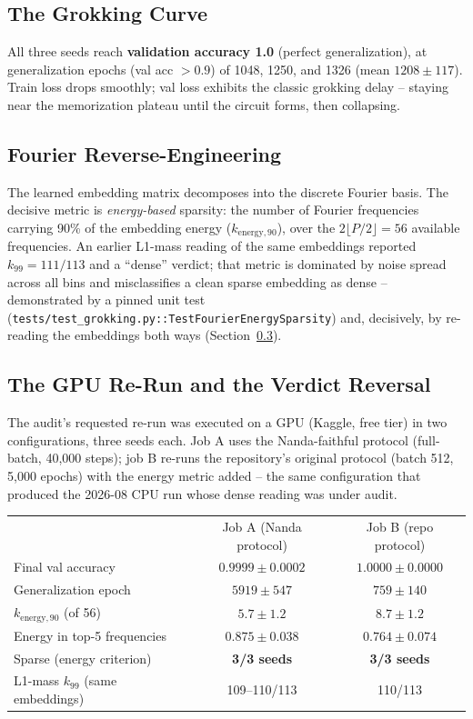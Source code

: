 \documentclass[11pt]{article}
\begin{document}
\subsection{The Grokking Curve}
All three seeds reach \textbf{validation accuracy 1.0} (perfect
generalization), at generalization epochs (val acc $>0.9$) of 1048, 1250,
and 1326 (mean $1208 \pm 117$). Train loss drops smoothly; val loss
exhibits the classic grokking delay -- staying near the memorization
plateau until the circuit forms, then collapsing.

\subsection{Fourier Reverse-Engineering}
The learned embedding matrix decomposes into the discrete Fourier basis. The
decisive metric is \emph{energy-based} sparsity: the number of Fourier
frequencies carrying 90\% of the embedding energy ($k_{\mathrm{energy},90}$),
over the $2\lfloor P/2 \rfloor = 56$ available frequencies. An earlier
L1-mass reading of the same embeddings reported $k_{99} = 111/113$ and a
``dense'' verdict; that metric is dominated by noise spread across all bins
and misclassifies a clean sparse embedding as dense -- demonstrated by a
pinned unit test (\texttt{tests/test\_grokking.py::TestFourierEnergySparsity})
and, decisively, by re-reading the embeddings both ways (Section~\ref{sec:verdict-reversal}).

\subsection{The GPU Re-Run and the Verdict Reversal}
\label{sec:verdict-reversal}

The audit's requested re-run was executed on a GPU (Kaggle, free tier) in two
configurations, three seeds each. Job A uses the Nanda-faithful protocol
(full-batch, 40{,}000 steps); job B re-runs the repository's original protocol
(batch 512, 5{,}000 epochs) with the energy metric added -- the same
configuration that produced the 2026-08 CPU run whose dense reading was under
audit.

\begin{center}
\begin{tabular}{lcc}
 & Job A (Nanda protocol) & Job B (repo protocol) \\
Final val accuracy & $0.9999 \pm 0.0002$ & $1.0000 \pm 0.0000$ \\
Generalization epoch & $5919 \pm 547$ & $759 \pm 140$ \\
$k_{\mathrm{energy},90}$ (of 56) & $\mathbf{5.7 \pm 1.2}$ & $\mathbf{8.7 \pm 1.2}$ \\
Energy in top-5 frequencies & $0.875 \pm 0.038$ & $0.764 \pm 0.074$ \\
Sparse (energy criterion) & \textbf{3/3 seeds} & \textbf{3/3 seeds} \\
L1-mass $k_{99}$ (same embeddings) & 109--110/113 & 110/113 \\
\end{tabular}
\end{center}
\end{document}
